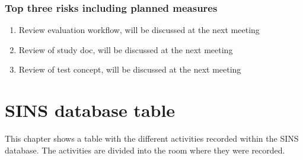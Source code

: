 \subsection{Top three risks including planned measures}
\begin{enumerate}
    \setlength\itemsep{0em}
    \item Review evaluation workflow, will be discussed at the next meeting
    \item Review of study doc, will be discussed at the next meeting
    \item Review of test concept, will be discussed at the next meeting 
\end{enumerate}

\chapter{SINS database table}
\label{app:SINS-Databse-Table}
This chapter shows a table with the different activities recorded within the SINS database. The activities are divided into the room where they were recorded.

